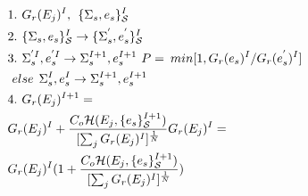 \documentclass[aps,pre,reprint,superscriptaddress,showkeys]{revtex4-1}
\begin{document}
\begin{equation}
\begin{split}
&1.\hspace{0.125cm} G_{r}(E_j)^I ,\hspace{0.15cm}  \{\Sigma_{s},e_s\}_{\mathcal{S}}^I\\
&2. \hspace{0.125cm}\{\Sigma_{s},e_s\}_{\mathcal{S}}^I \rightarrow  \{\Sigma_{s}^{'},e_s^{'}\}_{\mathcal{S}}^I\\
&3. \hspace{0.125cm} \Sigma_{s}^{'I}, e_s^{'I} \rightarrow \Sigma_{s}^{I+1},e_s^{I+1}   \hspace{0.125cm} P = \hspace{0.075cm} min [1, G_r(e_s)^{I}/G_r(e_s^{'})^{I}]\\
& \hspace{0.125cm}else  \hspace{0.15cm} \Sigma_{s}^I, e_s^I \rightarrow \Sigma_{s}^{I+1}, e_s^{I+1}\\
&4. \hspace{0.125cm} G_{r}(E_j)^{I+1} =  \\
& G_{r}(E_j)^{I} + \frac{C_o \mathcal{H}(E_j,\{e_s\}_{\mathcal{S}}^{I+1}) }{ [\sum_j G_{r}(E_j)^{I}]^{\frac{1}{N} } }G_{r}(E_j)^{I} = \\
& G_{r}(E_j)^{I}( 1 +  \frac{C_o \mathcal{H}(E_j,\{e_s\}_{\mathcal{S}}^{I+1}) }{ [\sum_j G_{r}(E_j)^{I}]^{\frac{1}{N} } } )\\
\end{split}
\label{blender}
\end{equation}
\end{document}
